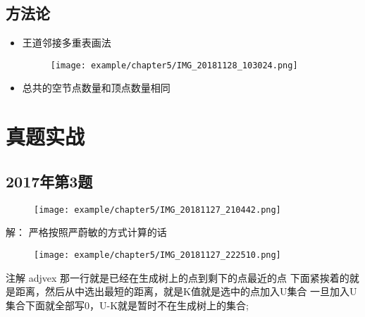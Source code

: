 \subsection{方法论}

\begin{itemize}[noitemsep,topsep=0pt,parsep=0pt,partopsep=0pt]
	\item 王道邻接多重表画法
	\begin{figure}[H]
	\centering  %
	\texttt{[image: example/chapter5/IMG\_20181128\_103024.png]}
	\end{figure}
	\item 总共的空节点数量和顶点数量相同
\end{itemize}


\section{真题实战}


\subsection{2017年第3题}

\begin{figure}[H]
\centering  %
\texttt{[image: example/chapter5/IMG\_20181127\_210442.png]}
\end{figure}

解：\newline
严格按照严蔚敏的方式计算的话\newline
\begin{figure}[H]
\centering  %
\texttt{[image: example/chapter5/IMG\_20181127\_222510.png]}
\end{figure}
注解  \newline
adjvex 那一行就是已经在生成树上的点到剩下的点最近的点\newline
下面紧挨着的就是距离，然后从中选出最短的距离，就是K值就是选中的点加入U集合\newline
一旦加入U集合下面就全部写0，U-K就是暂时不在生成树上的集合;\newline

